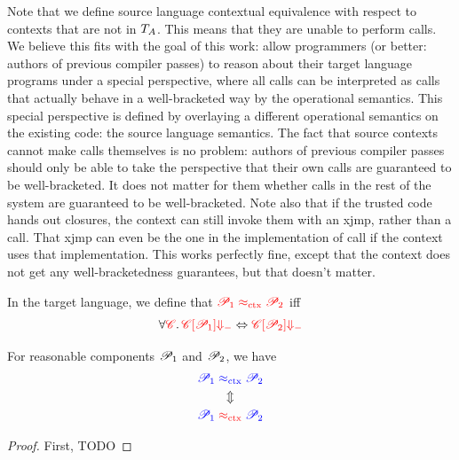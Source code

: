 \documentclass[a4paper]{article}
\begin{document}
Note that we define source language contextual equivalence with respect to contexts that are not in $T_{A}$.
This means that they are unable to perform calls.
We believe this fits with the goal of this work: allow programmers (or better: authors of previous compiler passes) to reason about their target language programs under a special perspective, where all calls can be interpreted as calls that actually behave in a well-bracketed way by the operational semantics.
This special perspective is defined by overlaying a different operational semantics on the existing code: the source language semantics.
The fact that source contexts cannot make calls themselves is no problem: authors of previous compiler passes should only be able to take the perspective that their own calls are guaranteed to be well-bracketed.
It does not matter for them whether calls in the rest of the system are guaranteed to be well-bracketed.
Note also that if the trusted code hands out closures, the context can still invoke them with an xjmp, rather than a call.
That xjmp can even be the one in the implementation of call if the context uses that implementation. 
This works perfectly fine, except that the context does not get any well-bracketedness guarantees, but that doesn't matter.

\begin{definition}
  In the target language, we define that ${\color{red} \mathscr{P}_1 \mathrel{{\color{red} \approx_{\mathrm{ctx}}}} \mathscr{P}_2}$ iff
  \begin{equation*}
    \forall {\color{red} \mathscr{C}} \ldotp {\color{red} \mathscr{C}[\mathscr{P}_1] {\Downarrow_{-}}} \Leftrightarrow {\color{red} \mathscr{C}[\mathscr{P}_2] {\Downarrow_{-}}}
  \end{equation*}
\end{definition}

\begin{theorem}
  \label{thm:full-abstraction}
  For reasonable components $\mathscr{P}_1$ and $\mathscr{P}_2$, we have
  \begin{gather*}
    {\color{blue}\mathscr{P}_1} \mathrel{{\color{blue} \approx_{\mathrm{ctx}}}} {\color{blue} \mathscr{P}_2}\\
    \Updownarrow\\
    {\color{blue} \mathscr{P}_1} \mathrel{{\color{red} \approx_{\mathrm{ctx}}}} {\color{blue} \mathscr{P}_2}
  \end{gather*}
\end{theorem}
\begin{proof}
  First, 
  TODO
\end{proof}

\end{document}
